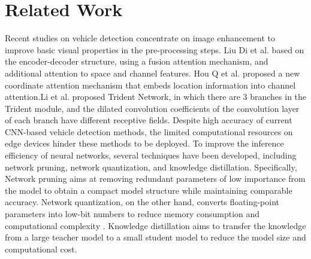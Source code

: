 \documentclass[conference]{IEEEtran}
\begin{document}
\section{Related Work}
Recent studies on vehicle detection concentrate on image enhancement to improve basic visual properties in the pre-processing steps. Liu Di et al.\cite{id01} based on the encoder-decoder structure, using a fusion attention mechanism, and additional attention to space and channel features. Hou Q et al. \cite{id02} proposed a new coordinate attention mechanism that embeds location information into channel attention.Li et al. \cite{id03}proposed Trident Network, in which there are 3 branches in the Trident module, and the dilated convolution coefficients of the convolution layer of each branch have different receptive fields. 
Despite high accuracy of current CNN-based vehicle detection methods, the limited computational resources on edge devices hinder these methods to be deployed. To improve the inference efficiency of neural networks, several techniques have been developed, including network pruning, network quantization, and knowledge distillation. Specifically, Network pruning aims at removing redundant parameters of low importance from the model to obtain a compact model structure while maintaining comparable accuracy. Network quantization, on the other hand, converts floating-point parameters into low-bit numbers to reduce memory consumption and computational complexity \cite{id04}. Knowledge distillation aims to transfer the knowledge from a large teacher model to a small student model to reduce the model size and computational cost\cite{id05}.
\end{document}

